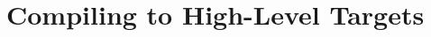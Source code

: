 \chapter{Compiling to High-Level Targets}\label{chap:high_level_targets}



% 
% 
% 
%

%

\listoffigures
\listoftables
{}
\printbibliography[heading=bibintoc]



